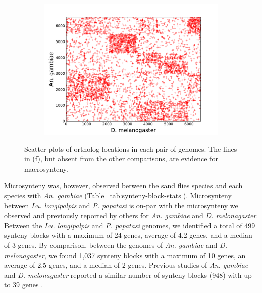 \begin{figure}[H]
\begin{subfigure}[b]{0.4\textwidth}
    \includegraphics[width=\textwidth]{figures/synteny/dmel_anopheles_plot}
    \caption{\label{fig:synteny-dotplots-anopheles-drosophila}}
  \end{subfigure}
  \label{fig:dot-plots}

  Scatter plots of ortholog locations in each pair of genomes. The lines in (f), but absent from the other comparisons, are evidence for macrosynteny.
\end{figure}

Microsynteny was, however, observed between the sand flies species and each species with \emph{An. gambiae} (Table~\ref{tab:synteny-block-stats}). Microsynteny between \emph{Lu. longipalpis} and \emph{P. papatasi} is on-par with the microsynteny we observed and previously reported by others for \emph{An. gambiae} and \emph{D. melonagaster}.  Between the \emph{Lu. longipalpis} and \emph{P. papatasi} genomes, we identified a total of 499 synteny blocks with a maximum of 24 genes, average of 4.2 genes, and a median of 3 genes. By comparison, between the genomes of \emph{An. gambiae} and \emph{D. melonagaster}, we found 1,037 synteny blocks with a maximum of 10 genes, an average of 2.5 genes, and a median of 2 genes. Previous studies of \emph{An. gambiae} and \emph{D. melonagaster} reported a similar number of synteny blocks (948) with up to 39 genes \cite{Zdobnov2002}.


